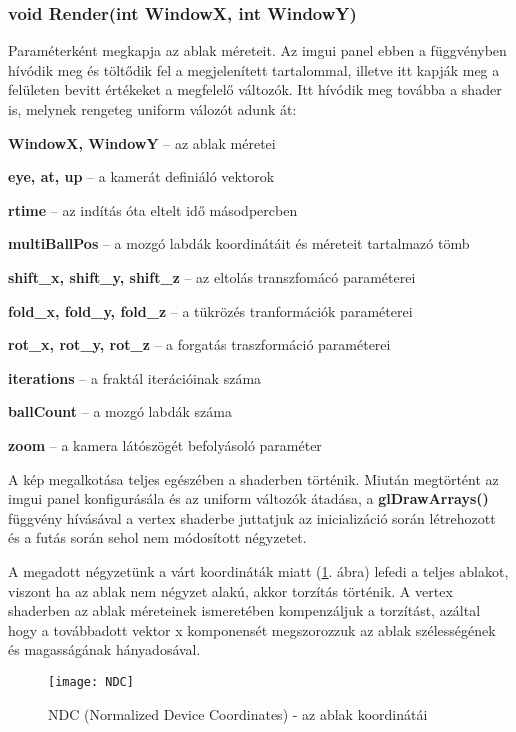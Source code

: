  
\subsubsection{void Render(int WindowX, int WindowY)} 

Paraméterként megkapja az ablak méreteit. Az imgui panel ebben a függvényben hívódik meg és töltődik fel a megjelenített tartalommal, illetve itt kapják meg a felületen bevitt értékeket a megfelelő változók. Itt hívódik meg továbba a shader is, melynek rengeteg uniform válozót adunk át:
\begin{compactitem}
	\item \textbf{WindowX, WindowY} -- az ablak méretei
	\item \textbf{eye, at, up} -- a kamerát definiáló vektorok
	\item \textbf{rtime} -- az indítás óta eltelt idő másodpercben
	\item \textbf{multiBallPos} -- a mozgó labdák koordinátáit és méreteit tartalmazó tömb
	\item \textbf{shift\_x, shift\_y, shift\_z} -- az eltolás transzfomácó paraméterei
	\item \textbf{fold\_x, fold\_y, fold\_z} -- a tükrözés tranformációk paraméterei
	\item \textbf{rot\_x, rot\_y, rot\_z} -- a forgatás traszformáció paraméterei
	\item \textbf{iterations} -- a fraktál iterációinak száma
	\item \textbf{ballCount} -- a mozgó labdák száma
	\item \textbf{zoom} -- a kamera látószögét befolyásoló paraméter
\end{compactitem}

A kép megalkotása teljes egészében a shaderben történik. Miután megtörtént az imgui panel konfigurásála és az uniform változók átadása, a \textbf{glDrawArrays()} függvény hívásával a vertex shaderbe juttatjuk az inicializáció során létrehozott és a futás során sehol nem módosított négyzetet.

A megadott négyzetünk a várt koordináták miatt (\ref{fig:NDC}. ábra) lefedi a teljes ablakot, viszont ha az ablak nem négyzet alakú, akkor torzítás történik. A vertex shaderben az ablak méreteinek ismeretében kompenzáljuk a torzítást, azáltal hogy a továbbadott vektor x komponensét megszorozzuk az ablak szélességének és magasságának hányadosával. 

\begin{figure}[H]
	\centering
	\texttt{[image: NDC]}
	\caption{NDC (Normalized Device Coordinates) - az ablak koordinátái \cite{PythonOp51:online} }
	\label{fig:NDC}
\end{figure}

